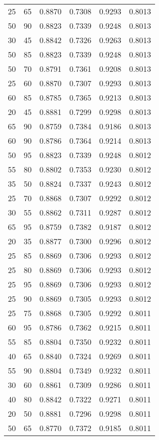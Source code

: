 \begin{center}
\begin{longtable}{|l|l|l|l|l|l|}
25 & 65 & 0.8870 & 0.7308 & 0.9293 & 0.8013 \\
50 & 90 & 0.8823 & 0.7339 & 0.9248 & 0.8013 \\
30 & 45 & 0.8842 & 0.7326 & 0.9263 & 0.8013 \\
50 & 85 & 0.8823 & 0.7339 & 0.9248 & 0.8013 \\
50 & 70 & 0.8791 & 0.7361 & 0.9208 & 0.8013 \\
25 & 60 & 0.8870 & 0.7307 & 0.9293 & 0.8013 \\
60 & 85 & 0.8785 & 0.7365 & 0.9213 & 0.8013 \\
20 & 45 & 0.8881 & 0.7299 & 0.9298 & 0.8013 \\
65 & 90 & 0.8759 & 0.7384 & 0.9186 & 0.8013 \\
60 & 90 & 0.8786 & 0.7364 & 0.9214 & 0.8013 \\
50 & 95 & 0.8823 & 0.7339 & 0.9248 & 0.8012 \\
55 & 80 & 0.8802 & 0.7353 & 0.9230 & 0.8012 \\
35 & 50 & 0.8824 & 0.7337 & 0.9243 & 0.8012 \\
25 & 70 & 0.8868 & 0.7307 & 0.9292 & 0.8012 \\
30 & 55 & 0.8862 & 0.7311 & 0.9287 & 0.8012 \\
65 & 95 & 0.8759 & 0.7382 & 0.9187 & 0.8012 \\
20 & 35 & 0.8877 & 0.7300 & 0.9296 & 0.8012 \\
25 & 85 & 0.8869 & 0.7306 & 0.9293 & 0.8012 \\
25 & 80 & 0.8869 & 0.7306 & 0.9293 & 0.8012 \\
25 & 95 & 0.8869 & 0.7306 & 0.9293 & 0.8012 \\
25 & 90 & 0.8869 & 0.7305 & 0.9293 & 0.8012 \\
25 & 75 & 0.8868 & 0.7305 & 0.9292 & 0.8011 \\
60 & 95 & 0.8786 & 0.7362 & 0.9215 & 0.8011 \\
55 & 85 & 0.8804 & 0.7350 & 0.9232 & 0.8011 \\
40 & 65 & 0.8840 & 0.7324 & 0.9269 & 0.8011 \\
55 & 90 & 0.8804 & 0.7349 & 0.9232 & 0.8011 \\
30 & 60 & 0.8861 & 0.7309 & 0.9286 & 0.8011 \\
40 & 80 & 0.8842 & 0.7322 & 0.9271 & 0.8011 \\
20 & 50 & 0.8881 & 0.7296 & 0.9298 & 0.8011 \\
50 & 65 & 0.8770 & 0.7372 & 0.9185 & 0.8011 \\

\end{longtable}
\end{center}
